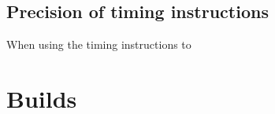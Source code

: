 
\subsection{Precision of timing instructions}
\label{subsec:precision_timing_inst_ptarm}

When using the timing instructions to 

\section{Builds}
